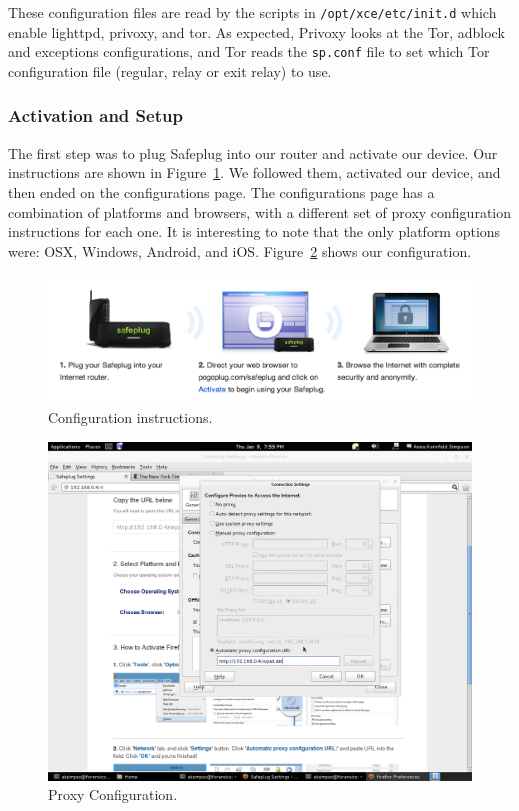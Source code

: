 These configuration files are read by the scripts in \verb!/opt/xce/etc/init.d! which enable lighttpd, privoxy, and tor.  As expected, Privoxy looks at the Tor, adblock and exceptions configurations, and Tor reads the \verb!sp.conf! file to set which Tor configuration file (regular, relay or exit relay) to use.

\subsubsection{Activation and Setup}
The first step was to plug Safeplug into our router and activate our device.  Our instructions are shown in Figure~\ref{fig:instructions}.  We followed them, activated our device, and then ended on the configurations page.  The configurations page has a combination of platforms and browsers, with a different set of proxy configuration instructions for each one.  It is interesting to note that the only platform options were: OSX, Windows, Android, and iOS.  Figure~\ref{fig:proxyconfig} shows our configuration. 

\begin{figure}[t]
\begin{center}
\includegraphics[width=.75\textwidth]{instructions}
\caption{Configuration instructions.}
\label{fig:instructions}
\end{center}
\end{figure}

\begin{figure}[t]
\begin{center}
\includegraphics[width=.75\textwidth]{proxyconfig}
\caption{Proxy Configuration.}
\label{fig:proxyconfig}
\end{center}
\end{figure}

